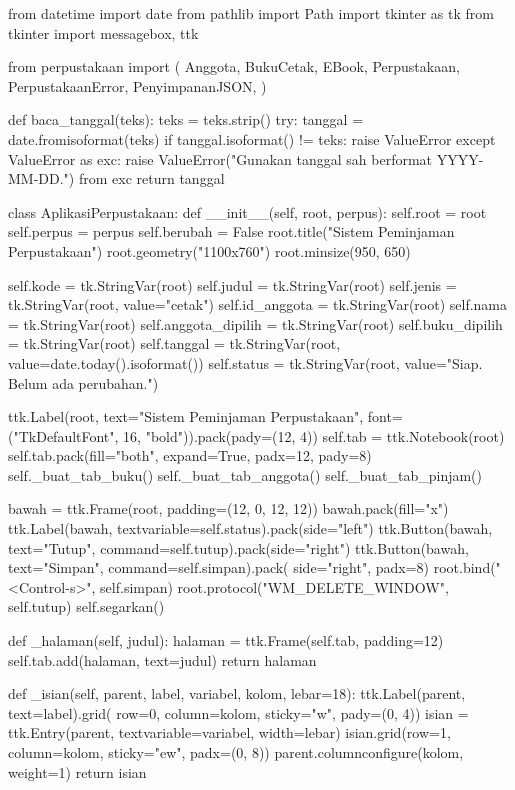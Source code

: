 \begin{kode}[gui.py]
from datetime import date
from pathlib import Path
import tkinter as tk
from tkinter import messagebox, ttk

from perpustakaan import (
    Anggota, BukuCetak, EBook, Perpustakaan,
    PerpustakaanError, PenyimpananJSON,
)


def baca_tanggal(teks):
    teks = teks.strip()
    try:
        tanggal = date.fromisoformat(teks)
        if tanggal.isoformat() != teks:
            raise ValueError
    except ValueError as exc:
        raise ValueError("Gunakan tanggal sah berformat YYYY-MM-DD.") from exc
    return tanggal


class AplikasiPerpustakaan:
    def __init__(self, root, perpus):
        self.root = root
        self.perpus = perpus
        self.berubah = False
        root.title("Sistem Peminjaman Perpustakaan")
        root.geometry("1100x760")
        root.minsize(950, 650)

        self.kode = tk.StringVar(root)
        self.judul = tk.StringVar(root)
        self.jenis = tk.StringVar(root, value="cetak")
        self.id_anggota = tk.StringVar(root)
        self.nama = tk.StringVar(root)
        self.anggota_dipilih = tk.StringVar(root)
        self.buku_dipilih = tk.StringVar(root)
        self.tanggal = tk.StringVar(root, value=date.today().isoformat())
        self.status = tk.StringVar(root, value="Siap. Belum ada perubahan.")

        ttk.Label(root, text="Sistem Peminjaman Perpustakaan",
                  font=("TkDefaultFont", 16, "bold")).pack(pady=(12, 4))
        self.tab = ttk.Notebook(root)
        self.tab.pack(fill="both", expand=True, padx=12, pady=8)
        self._buat_tab_buku()
        self._buat_tab_anggota()
        self._buat_tab_pinjam()

        bawah = ttk.Frame(root, padding=(12, 0, 12, 12))
        bawah.pack(fill="x")
        ttk.Label(bawah, textvariable=self.status).pack(side="left")
        ttk.Button(bawah, text="Tutup", command=self.tutup).pack(side="right")
        ttk.Button(bawah, text="Simpan", command=self.simpan).pack(
            side="right", padx=8)
        root.bind("<Control-s>", self.simpan)
        root.protocol("WM_DELETE_WINDOW", self.tutup)
        self.segarkan()

    def _halaman(self, judul):
        halaman = ttk.Frame(self.tab, padding=12)
        self.tab.add(halaman, text=judul)
        return halaman

    def _isian(self, parent, label, variabel, kolom, lebar=18):
        ttk.Label(parent, text=label).grid(
            row=0, column=kolom, sticky="w", pady=(0, 4))
        isian = ttk.Entry(parent, textvariable=variabel, width=lebar)
        isian.grid(row=1, column=kolom, sticky="ew", padx=(0, 8))
        parent.columnconfigure(kolom, weight=1)
        return isian


\end{kode}
